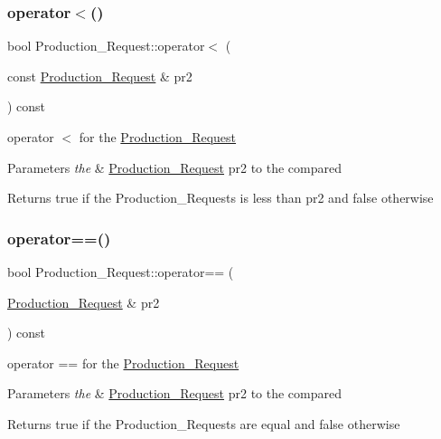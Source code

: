 \subsubsection{\texorpdfstring{operator$<$()}{operator<()}}
{\footnotesize\ttfamily bool Production\+\_\+\+Request\+::operator$<$ (\begin{DoxyParamCaption}\item[{const \hyperlink{class_production___request}{Production\+\_\+\+Request} \&}]{pr2 }\end{DoxyParamCaption}) const}



operator $<$ for the \hyperlink{class_production___request}{Production\+\_\+\+Request} 


\begin{DoxyParams}{Parameters}
{\em the} & \hyperlink{class_production___request}{Production\+\_\+\+Request} pr2 to the compared\\
\hline
\end{DoxyParams}
\begin{DoxyReturn}{Returns}
true if the Production\+\_\+\+Requests is less than pr2 and false otherwise 
\end{DoxyReturn}
\mbox{\label{class_production___request_a37fd21082c7c874be9587e8d3cce7174}} 
\subsubsection{\texorpdfstring{operator==()}{operator==()}}
{\footnotesize\ttfamily bool Production\+\_\+\+Request\+::operator== (\begin{DoxyParamCaption}\item[{\hyperlink{class_production___request}{Production\+\_\+\+Request} \&}]{pr2 }\end{DoxyParamCaption}) const}



operator == for the \hyperlink{class_production___request}{Production\+\_\+\+Request} 


\begin{DoxyParams}{Parameters}
{\em the} & \hyperlink{class_production___request}{Production\+\_\+\+Request} pr2 to the compared\\
\hline
\end{DoxyParams}
\begin{DoxyReturn}{Returns}
true if the Production\+\_\+\+Requests are equal and false otherwise 
\end{DoxyReturn}
\mbox{\label{class_production___request_a3329479425a0e91eec8cf2f8fabc185e}} 
